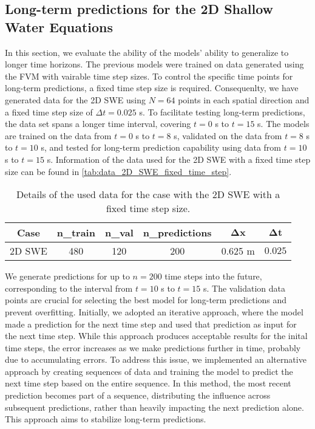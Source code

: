 \subsection{Long-term predictions for the 2D Shallow Water Equations}\label{sec:2D_SWE_long_term_predictions}
In this section, we evaluate the ability of the models' ability to generalize to longer time horizons.
The previous models were trained on data generated using the FVM with vairable time step sizes.
To control the specific time points for long-term predictions, a fixed time step size is required.
Consequenlty, we have generated data for the 2D SWE using $N = 64$ points in each spatial direction and a fixed time step size of $\Delta t = 0.025$ s.
To facilitate testing long-term predictions, the data set spans a longer time interval, covering $t = 0$ s to $t = 15$ s.
The models are trained on the data from $t = 0$ s to $t = 8$ s, validated on the data from $t = 8$ s to $t = 10$ s, and tested for long-term prediction capability using data from $t = 10$ s to $t = 15$ s.
Information of the data used for the 2D SWE with a fixed time step size can be found in \autoref{tab:data_2D_SWE_fixed_time_step}.
\begin{table}[H]
    \centering
    \begin{tabular}{c|ccccc}
        \textbf{Case} & \textbf{n\_train} & \textbf{n\_val} & \textbf{n\_predictions} & $\mathbf{\Delta x}$ & $\mathbf{\Delta t}$ \\
        \hline
        2D SWE & 480 & 120 & 200 & 0.625 m  & $0.025$ \\
    \end{tabular}
    \caption{Details of the used data for the case with the 2D SWE with a fixed time step size.}\label{tab:data_2D_SWE_fixed_time_step}
\end{table}
We generate predictions for up to $n = 200$ time steps into the future, corresponding to the interval from $t = 10$ s to $t = 15$ s.
The validation data points are crucial for selecting the best model for long-term predictions and prevent overfitting.
Initially, we adopted an iterative approach, where the model made a prediction for the next time step and used that prediction as input for the next time step.
While this approach produces acceptable results for the inital time steps, the error increases as we make predictions further in time, probably due to accumulating errors.
To address this issue, we implemented an alternative approach by creating sequences of data and training the model to predict the next time step based on the entire sequence.
In this method, the most recent prediction becomes part of a sequence, distributing the influence across subsequent predictions, rather than heavily impacting the next prediction alone.
This approach aims to stabilize long-term predictions.

